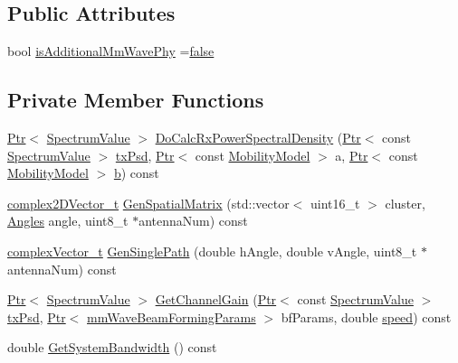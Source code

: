 \subsection*{Public Attributes}
\begin{DoxyCompactItemize}
\item 
bool \hyperlink{classns3_1_1MmWaveChannelMatrix_a6427b27c8ebd5fb5327c7403174caf31}{is\+Additional\+Mm\+Wave\+Phy} =\hyperlink{lte__cqi__generation_8m_ab1bef239d413c4da139c4bac92cd657a}{false}
\end{DoxyCompactItemize}
\subsection*{Private Member Functions}
\begin{DoxyCompactItemize}
\item 
\hyperlink{classns3_1_1Ptr}{Ptr}$<$ \hyperlink{classns3_1_1SpectrumValue}{Spectrum\+Value} $>$ \hyperlink{classns3_1_1MmWaveChannelMatrix_a707a28baf614560635774d0994a656f3}{Do\+Calc\+Rx\+Power\+Spectral\+Density} (\hyperlink{classns3_1_1Ptr}{Ptr}$<$ const \hyperlink{classns3_1_1SpectrumValue}{Spectrum\+Value} $>$ \hyperlink{lte__link__budget__x2__handover__measures_8m_a684fe3101a5e48a5fcc57cab8dbcd1aa}{tx\+Psd}, \hyperlink{classns3_1_1Ptr}{Ptr}$<$ const \hyperlink{classns3_1_1MobilityModel}{Mobility\+Model} $>$ a, \hyperlink{classns3_1_1Ptr}{Ptr}$<$ const \hyperlink{classns3_1_1MobilityModel}{Mobility\+Model} $>$ \hyperlink{lte__pathloss_8m_a21ad0bd836b90d08f4cf640b4c298e7c}{b}) const 
\item 
\hyperlink{namespacens3_aa25e3feece2676fd7470d50d4ba3d1d1}{complex2\+D\+Vector\+\_\+t} \hyperlink{classns3_1_1MmWaveChannelMatrix_a1395b9e11d00ccf0188e0b464a4b0fdb}{Gen\+Spatial\+Matrix} (std\+::vector$<$ uint16\+\_\+t $>$ cluster, \hyperlink{structns3_1_1Angles}{Angles} angle, uint8\+\_\+t $\ast$antenna\+Num) const 
\item 
\hyperlink{namespacens3_a6a7f75817ae50e6ac47414955b17d926}{complex\+Vector\+\_\+t} \hyperlink{classns3_1_1MmWaveChannelMatrix_ae034ee8262dacddc18427ddbf21cb84b}{Gen\+Single\+Path} (double h\+Angle, double v\+Angle, uint8\+\_\+t $\ast$antenna\+Num) const 
\item 
\hyperlink{classns3_1_1Ptr}{Ptr}$<$ \hyperlink{classns3_1_1SpectrumValue}{Spectrum\+Value} $>$ \hyperlink{classns3_1_1MmWaveChannelMatrix_a1c744518b5c26b1169cfc003c9662ee3}{Get\+Channel\+Gain} (\hyperlink{classns3_1_1Ptr}{Ptr}$<$ const \hyperlink{classns3_1_1SpectrumValue}{Spectrum\+Value} $>$ \hyperlink{lte__link__budget__x2__handover__measures_8m_a684fe3101a5e48a5fcc57cab8dbcd1aa}{tx\+Psd}, \hyperlink{classns3_1_1Ptr}{Ptr}$<$ \hyperlink{structns3_1_1mmWaveBeamFormingParams}{mm\+Wave\+Beam\+Forming\+Params} $>$ bf\+Params, double \hyperlink{mmwave-amc-test_8cc_a6dc6e6f3c75c509ce943163afb5dade7}{speed}) const 
\item 
double \hyperlink{classns3_1_1MmWaveChannelMatrix_a6a9cd8af5d1d6281329802644b8a3dd0}{Get\+System\+Bandwidth} () const 
\end{DoxyCompactItemize}
